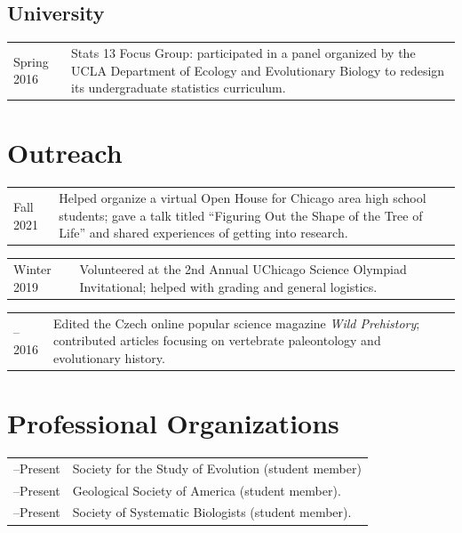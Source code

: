\documentclass[10pt]{article}
\begin{document}
\subsection*{University}

\begin{tabularx}{\textwidth}{>{\raggedleft\arraybackslash}p{2.2cm} X}
Spring 2016 & Stats 13 Focus Group: participated in a panel organized by the UCLA Department of Ecology and Evolutionary Biology to redesign its undergraduate statistics curriculum.
\end{tabularx}

\section*{Outreach}

\begin{tabularx}{\textwidth}{>{\raggedleft\arraybackslash}p{2.2cm} X}
Fall 2021 & Helped organize a virtual Open House for Chicago area high school students; gave a talk titled ``Figuring Out the Shape of the Tree of Life'' and shared experiences of getting into research.
\end{tabularx}
\begin{tabularx}{\textwidth}{>{\raggedleft\arraybackslash}p{2.2cm} X}
Winter 2019 & Volunteered at the 2nd Annual UChicago Science Olympiad Invitational; helped with grading and general logistics.
\end{tabularx}
\begin{tabularx}{\textwidth}{>{\raggedleft\arraybackslash}p{2.2cm} X}
2015--2016 & Edited the Czech online popular science magazine \textit{Wild Prehistory}; contributed articles focusing on vertebrate paleontology and evolutionary history.
\end{tabularx}

\section*{Professional Organizations}

\begin{tabularx}{\textwidth}{>{\raggedleft\arraybackslash}p{2.2cm} X}
2023--Present & Society for the Study of Evolution (student member) \\[0.1cm]
2022--Present & Geological Society of America (student member). \\[0.1cm]
2017--Present & Society of Systematic Biologists (student member).
\end{tabularx}
\end{document}
